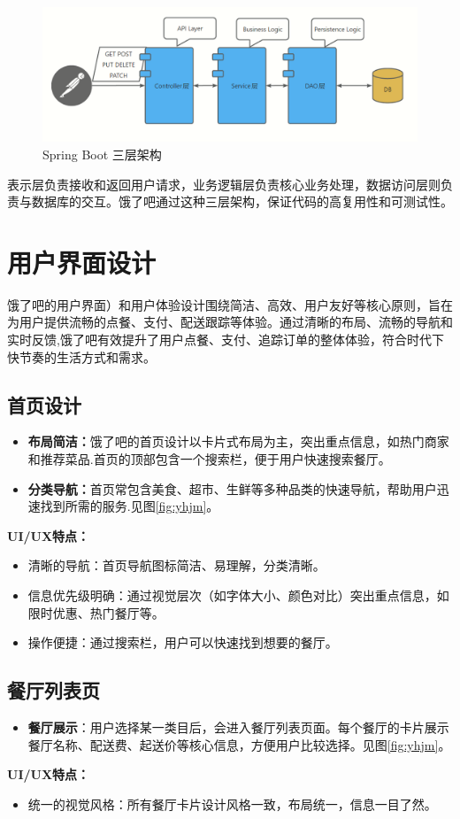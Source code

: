 \begin{figure}[H]
    \centering
    \includegraphics[width=1\linewidth]{pics/15.png}
    \caption{Spring Boot 三层架构}
    \label{fig:scjj}
\end{figure}
表示层负责接收和返回用户请求，业务逻辑层负责核心业务处理，数据访问层则负责与数据库的交互。饿了吧通过这种三层架构，保证代码的高复用性和可测试性。

\section{用户界面设计}
饿了吧的用户界面）和用户体验设计围绕简洁、高效、用户友好等核心原则，旨在为用户提供流畅的点餐、支付、配送跟踪等体验。通过清晰的布局、流畅的导航和实时反馈,饿了吧有效提升了用户点餐、支付、追踪订单的整体体验，符合时代下快节奏的生活方式和需求。
\subsection{首页设计}
\begin{itemize}
    \item \textbf{布局简洁：}饿了吧的首页设计以卡片式布局为主，突出重点信息，如热门商家和推荐菜品.首页的顶部包含一个搜索栏，便于用户快速搜索餐厅。
    \item \textbf{分类导航：}首页常包含美食、超市、生鲜等多种品类的快速导航，帮助用户迅速找到所需的服务.见图\ref{fig:yhjm}。
\end{itemize}
\textbf{UI/UX特点：}
\begin{itemize}
    \item 清晰的导航：首页导航图标简洁、易理解，分类清晰。
    \item 信息优先级明确：通过视觉层次（如字体大小、颜色对比）突出重点信息，如限时优惠、热门餐厅等。
    \item 操作便捷：通过搜索栏，用户可以快速找到想要的餐厅。
\end{itemize}

\subsection{餐厅列表页}
\begin{itemize}
    \item \textbf{餐厅展示}：用户选择某一类目后，会进入餐厅列表页面。每个餐厅的卡片展示餐厅名称、配送费、起送价等核心信息，方便用户比较选择。见图\ref{fig:yhjm}。
\end{itemize}
\textbf{UI/UX特点：}
    \begin{itemize}
        \item 统一的视觉风格：所有餐厅卡片设计风格一致，布局统一，信息一目了然。
    \end{itemize}
 
